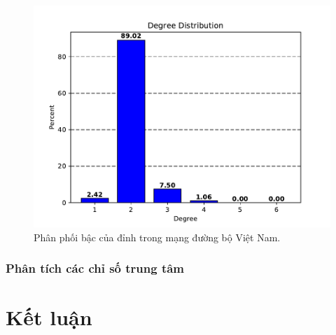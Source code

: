\documentclass[14pt, oneside, a4paper, openany]{scrartcl}
\begin{document}
\begin{figure}[!h]
	\centering
	\includegraphics[scale=0.8]{figures/degreedist.pdf} 
	\caption[Phân phối bậc của đỉnh trong mạng đường bộ Việt Nam]{Phân phối bậc của đỉnh trong mạng đường bộ Việt Nam.}
	\label{fig:degreedist}
\end{figure}
\subsubsection{Phân tích các chỉ số trung tâm}
\section{Kết luận}
\end{document}
